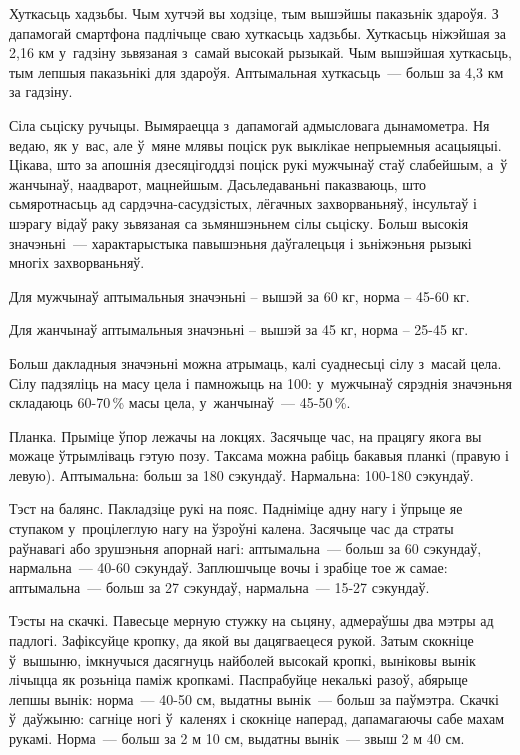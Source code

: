 Хуткасьць хадзьбы. Чым хутчэй вы ходзіце, тым вышэйшы паказьнік здароўя. З дапамогай смартфона падлічыце сваю хуткасьць хадзьбы. Хуткасьць ніжэйшая за 2,16 км у~гадзіну зьвязаная з~самай высокай рызыкай. Чым вышэйшая хуткасьць, тым лепшыя паказьнікі для здароўя. Аптымальная хуткасьць~--- больш за 4,3 км за гадзіну.

Сіла сьціску ручыцы. Вымяраецца з~дапамогай адмысловага дынамометра. Ня ведаю, як у~вас, але ў~мяне млявы поціск рук выклікае непрыемныя асацыяцыі. Цікава, што за апошнія дзесяцігоддзі поціск рукі мужчынаў стаў слабейшым, а~ў жанчынаў, наадварот, мацнейшым. Дасьледаваньні паказваюць, што сьмяротнасьць ад сардэчна-сасудзістых, лёгачных захворваньняў, інсультаў і шэрагу відаў раку зьвязаная са зьмяншэньнем сілы сьціску. Больш высокія значэньні~--- характарыстыка павышэньня даўгалецьця і зьніжэньня рызыкі многіх захворваньняў.

Для мужчынаў аптымальныя значэньні -- вышэй за 60 кг, норма -- 45-60 кг. 

Для жанчынаў аптымальныя значэньні -- вышэй за 45 кг, норма -- 25-45 кг. 

Больш дакладныя значэньні можна атрымаць, калі суаднесьці сілу з~масай цела. Сілу падзяліць на масу цела і памножыць на 100: у~мужчынаў сярэднія значэньня складаюць 60-70\,\% масы цела, у~жанчынаў~--- 45-50\,\%.

Планка. Прыміце ўпор лежачы на локцях. Засячыце час, на працягу якога вы можаце ўтрымліваць гэтую позу. Таксама можна рабіць бакавыя планкі (правую і левую). Аптымальна: больш за 180 сэкундаў. Нармальна: 100-180 сэкундаў.

Тэст на балянс. Пакладзіце рукі на пояс. Падніміце адну нагу і ўпрыце яе ступаком у~процілеглую нагу на ўзроўні калена. Засячыце час да страты раўнавагі або зрушэньня апорнай нагі: аптымальна~--- больш за 60 сэкундаў, нармальна~--- 40-60 сэкундаў. Заплюшчыце вочы і зрабіце тое ж самае: аптымальна~--- больш за 27 сэкундаў, нармальна~--- 15-27 сэкундаў.

Тэсты на скачкі. Павесьце мерную стужку на сьцяну, адмераўшы два мэтры ад падлогі. Зафіксуйце кропку, да якой вы дацягваецеся рукой. Затым скокніце ў~вышыню, імкнучыся дасягнуць найболей высокай кропкі, выніковы вынік лічыцца як розьніца паміж кропкамі. Паспрабуйце некалькі разоў, абярыце лепшы вынік: норма~--- 40-50 см, выдатны вынік~--- больш за паўмэтра. Скачкі ў~даўжыню: сагніце ногі ў~каленях і скокніце наперад, дапамагаючы сабе махам рукамі. Норма~--- больш за 2 м 10 см, выдатны вынік~--- звыш 2 м 40 см.

